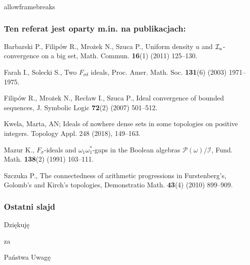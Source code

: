 \documentclass{beamer}
\begin{document}
\begin{frame}[label=bibliografia]{allowframebreaks}
\frametitle{Ten referat jest oparty m.in. na publikacjach:}
\beamertemplatebookbibitems
\begin{thebibliography}{10}{
{\sc Barbarski P., Filipów R., Mrożek N., Szuca P.},
{Uniform density $u$ and $\mathcal I_u$-convergence on a big set},
Math. Commun. {\bf 16}(1) (2011) 125--130.
\hyperlink{powrotBFMS}{}

{\sc Farah I., Solecki S.}, {Two $F_{\sigma\delta}$ ideals},
Proc. Amer. Math. Soc. {\bf 131}(6) (2003) 1971--1975.
\hyperlink{powrotIF}{}

{\sc Filip\'ow R., Mro\.zek N., Rec\l{}aw I., Szuca P.}, {Ideal convergence of bounded sequences},
J. Symbolic Logic {\bf 72}(2) (2007) 501--512.
\hyperlink{powrotFMRS}{}

 {\sc Kwela, Marta, AN;} {Ideals of nowhere dense sets in some topologies on positive integers.} Topology Appl. 248 (2018), 149–163.
}

{\sc Mazur K.}, {$F_\sigma$-ideals and $\omega_1\omega_1^*$-gaps in the Boolean algebras $\mathcal{P}(\omega)/\mathcal{I}$}, Fund. Math. {\bf 138}(2) (1991) 103--111.
\hyperlink{powrotMaz}{}

{\sc Szczuka P.}, {The connectedness of arithmetic progressions in Furstenberg's, Golomb's and Kirch's topologies},
Demonstratio Math. {\bf 43}(4) (2010) 899--909.
\hyperlink{powrotPS}{}

\end{thebibliography}
\end{frame}

\begin{frame}\frametitle{Ostatni slajd}
\begin{center}{\Huge Dziękuję}\end{center}
\begin{center}{\Huge za}\end{center}
\begin{center}{\Huge Państwa Uwagę}\end{center}
\end{frame}
\end{document}
